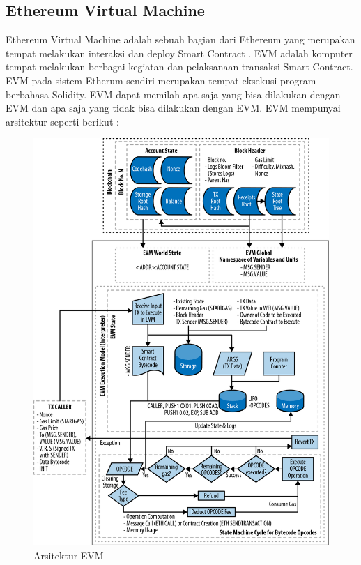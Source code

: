 \subsection{Ethereum Virtual Machine}
\label{subsec:evm}

Ethereum Virtual Machine adalah sebuah bagian dari Ethereum yang merupakan tempat melakukan interaksi dan deploy Smart Contract \cite{MasteringEthGavinWood}. EVM adalah komputer tempat melakukan berbagai kegiatan dan pelaksanaan transaksi Smart Contract. EVM pada sistem Etherum sendiri merupakan tempat eksekusi program berbahasa Solidity. EVM dapat memilah apa saja yang bisa dilakukan dengan EVM dan apa saja yang tidak bisa dilakukan dengan EVM. EVM mempunyai arsitektur seperti berikut :
\\
\begin{figure}[htp]
\centering
\includegraphics[scale=1.2]{gambar/arsitektur-evm.png}
\caption{Arsitektur EVM}
\end{figure}

